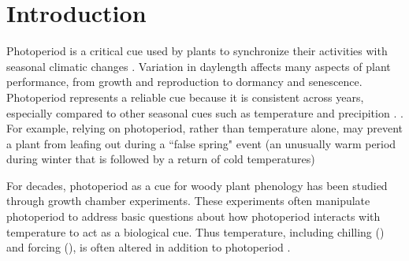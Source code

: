 \documentclass{article}
\begin{document}
\fi


\iffalse
Nacho's comments 10 October 2018

Not sooo much to add to Lizzie's super helpful comments at this stage. Thanks Ailene for putting this together, 
reading it still makes me very excited about the topic, but perhaps we can still make it more appealing. Just a couple comments:
	

- I agree that we should restrict to plants in the intro and leaving the overview of how this paper may be 
important for other taxa to the end. 

- We say that photoperiod matters but not why it matters. Perhaps we should mention that, one reason why photoperiod would matter to plants is that it is directly related with the amount
of photosynthesis a plant can do, thus influencing physiological processes such as growth. This is obviously
important to plants and yet, commonly overlooked in forecasts. We can try to mention this in a non-text book fashion. 
\fi


\section*{Introduction}
\par Photoperiod is a critical cue used by plants to synchronize their activities with seasonal climatic changes \citep[e.g.,][]{Hsu:2011,Singh:2017,Basler:2012}. Variation in daylength affects many aspects of plant performance, from growth and reproduction to dormancy and senescence.  Photoperiod represents a reliable cue because it is consistent across years, especially compared to other seasonal cues such as temperature and precipition \citep{saikkonen2012}. 
. For example, relying on photoperiod, rather than temperature alone, may prevent a plant from leafing out during a ``false spring" event (an unusually warm period during winter that is followed by a return of cold temperatures) %

\par  For decades, photoperiod as a cue for woody plant phenology has been studied through growth chamber experiments.  These experiments often  manipulate photoperiod to address basic questions about how photoperiod interacts with temperature to act as a biological cue. Thus temperature, including chilling () and forcing (), is often altered in addition to photoperiod \citep[e.g.,][]{Campbell:1975aa,HEIDE:1977aa,Falusi:1990aa,Spann:2004aa,Laube:2014a}. 
\end{document}
